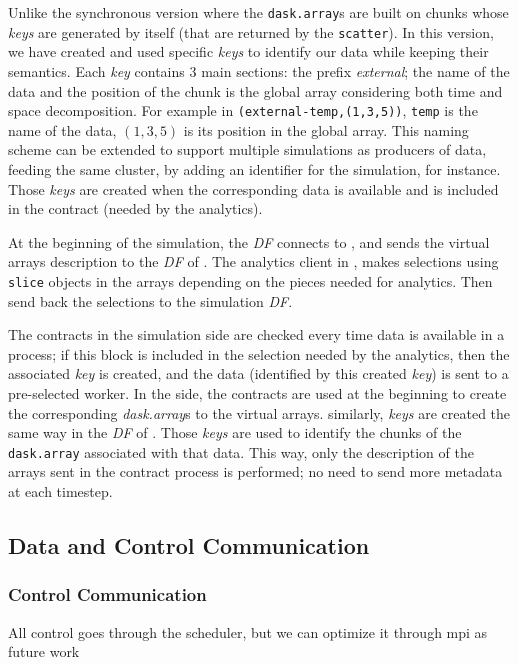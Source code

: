 Unlike the synchronous version where the \texttt{dask.array}s are built on chunks whose \textit{keys} are generated by \dask itself (that are returned by the \texttt{scatter}). In this version, we have created and used specific \textit{keys} to identify our data while keeping their semantics. Each \textit{key} contains 3 main sections:  the prefix \textit{external}; the name of the data and the position of the chunk is the global array considering both time and space decomposition. For example in  \texttt{(external-temp,(1,3,5))}, \texttt{temp} is the name of the data, $(1,3,5)$ is its position in the global array. This naming scheme can be extended to support multiple simulations as producers of data, feeding the same \dask cluster, by adding an identifier for the simulation, for instance. Those \textit{keys} are created when the corresponding data is available and is included in the contract (needed by the analytics).  

At the beginning of the simulation, the \textit{DF} connects to \dask, and sends the \deisa virtual arrays description to the \textit{DF} of \dask. The analytics client in \dask, makes selections using \texttt{slice} objects in the \deisa arrays depending on the pieces needed for analytics. Then send back the selections to the simulation \textit{DF}.

The contracts in the simulation side are checked every time data is available in a process; if this block is included in the selection needed by the analytics, then the associated \textit{key} is created, and the data (identified by this created \textit{key}) is sent to a pre-selected worker. In the \dask side, the contracts are used at the beginning to create the corresponding \textit{dask.array}s to the \deisa virtual arrays. similarly, \textit{keys} are created the same way in the \textit{DF} of \dask. Those \textit{keys} are used to identify the chunks of the \texttt{dask.array} associated with that data. This way, only the description of the arrays sent in the contract process is performed; no need to send more metadata at each timestep.  


\subsection{Data and Control Communication}\label{sec:DandCcomm}


\subsubsection{Control Communication}\label{sec:DandCcomm:control}
All control goes through the scheduler, but we can optimize it through mpi as future work 
